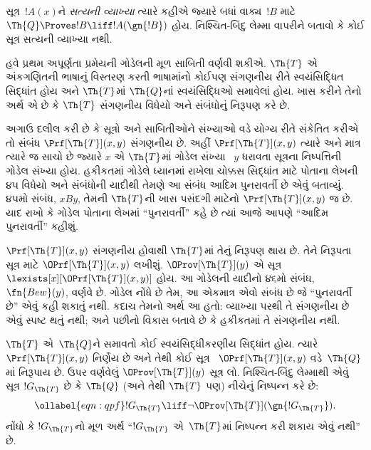 \begin{prob}
  સૂત્ર~$!A(x)$ને
  \emph{સત્યની વ્યાખ્યા}
  ત્યારે કહીએ જ્યારે બધાં
  વાક્ય~$!B$ માટે
  $\Th{Q}
  \Proves !B \liff !A(\gn{!B})$
  હોય. નિશ્ચિત-બિંદુ લેમ્મા
  વાપરીને બતાવો કે કોઈ
  સૂત્ર સત્યની
  વ્યાખ્યા નથી.
\end{prob}
\endgroup


\begingroup
\makeatletter{}\makeatother


\label{guunit:OLP-0315}


હવે પ્રથમ અપૂર્ણતા પ્રમેયની
ગોડેલની મૂળ સાબિતી
વર્ણવી શકીએ. $\Th{T}$
એ અંકગણિતની ભાષાનું
વિસ્તરણ કરતી ભાષામાંનો
કોઈપણ સંગણનીય રીતે
સ્વયંસિદ્ધિત સિદ્ધાંત હોય
અને $\Th{T}$માં
$\Th{Q}$નાં સ્વયંસિદ્ધિઓ
સમાવેલાં હોય. ખાસ કરીને
તેનો અર્થ એ છે કે
$\Th{T}$ સંગણનીય
વિધેયો અને સંબંધોનું
નિરૂપણ કરે છે.

અગાઉ દલીલ કરી છે કે
સૂત્રો અને સાબિતીઓને
સંખ્યાઓ વડે યોગ્ય રીતે
સંકેતિત કરીએ તો સંબંધ
$\Prf[\Th{T}](x,y)$
સંગણનીય છે. અહીં
$\Prf[\Th{T}](x,y)$
ત્યારે અને માત્ર ત્યારે જ
સાચો છે જ્યારે $x$ એ
$\Th{T}$માં ગોડેલ સંખ્યા
~$y$ ધરાવતા સૂત્રના
નિષ્પત્તિની ગોડેલ
સંખ્યા હોય. હકીકતમાં
ગોડેલે ધ્યાનમાં રાખેલા
ચોક્કસ સિદ્ધાંત માટે
પોતાના લેખની ૪૫ વિધેયો
અને સંબંધોની યાદીથી
તેમણે આ સંબંધ આદિમ
પુનરાવર્તી છે એવું બતાવ્યું.
૪૫મો સંબંધ, $x B y$,
તેમની $\Th{T}$ની ખાસ
પસંદગી માટેનો
$\Prf[\Th{T}](x,y)$
જ છે. યાદ રાખો કે
ગોડેલ પોતાના લેખમાં
``પુનરાવર્તી'' કહે છે
ત્યાં આજે આપણે
``આદિમ પુનરાવર્તી''
કહીશું.

$\Prf[\Th{T}](x,y)$ સંગણનીય
હોવાથી $\Th{T}$માં તેનું
નિરૂપણ થાય છે. તેને
નિરૂપતા સૂત્ર માટે
$\OPrf[\Th{T}](x,y)$
લખીશું. $\OProv[\Th{T}](y)$
એ સૂત્ર
$\lexists[x][\OPrf[\Th{T}](x,y)]$
હોય. આ ગોડેલની યાદીનો
૪૬મો સંબંધ,
$\fn{Bew}(y)$, વર્ણવે છે.
ગોડેલ નોંધે છે તેમ,
આ એકમાત્ર એવો સંબંધ
છે જે ``પુનરાવર્તી છે''
એવું કહી શકાતું નથી.
કદાચ તેમનો અર્થ આ હતો:
વ્યાખ્યા પરથી તે સંગણનીય
છે એવું સ્પષ્ટ થતું નથી;
અને પછીનો વિકાસ બતાવે
છે કે હકીકતમાં તે
સંગણનીય નથી.

$\Th{T}$ એ~$\Th{Q}$ને
સમાવતો કોઈ
સ્વયંસિદ્ધીકરણીય સિદ્ધાંત
હોય. ત્યારે
$\Prf[\Th{T}](x, y)$
નિર્ણેય છે અને તેથી
કોઈ સૂત્ર
~$\OPrf[\Th{T}](x, y)$
વડે~$\Th{Q}$માં નિરૂપાય
છે. ઉપર વર્ણવેલું
$\OProv[\Th{T}](y)$
સૂત્ર લો. નિશ્ચિત-બિંદુ
લેમ્માથી એવું સૂત્ર
$!G_\Th{T}$ છે કે
$\Th{Q}$ (અને તેથી
$\Th{T}$ પણ) નીચેનું
નિષ્પન્ન કરે છે:
\begin{equation}
\ollabel{eqn:qpf}
!G_\Th{T} \liff \lnot \OProv[\Th{T}](\gn{!G_\Th{T}}).
\end{equation}
નોંધો કે $!G_\Th{T}$નો
મૂળ અર્થ ``$!G_\Th{T}$
એ~$\Th{T}$માં
નિષ્પન્ન કરી શકાય એવું નથી'' છે.

